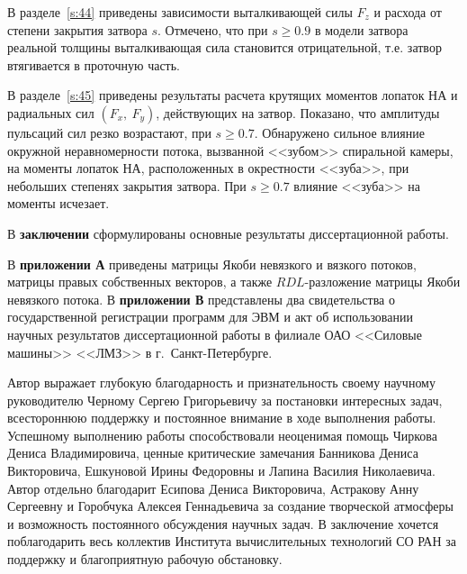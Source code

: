 В разделе~\ref{s:44} приведены зависимости выталкивающей силы $F_z$ и расхода от степени закрытия затвора $s$.
Отмечено, что при $s \geqslant 0.9$ в модели затвора реальной толщины выталкивающая сила становится 
отрицательной, т.е. затвор втягивается в проточную часть.

В разделе~\ref{s:45} приведены результаты расчета крутящих моментов лопаток НА 
и радиальных сил $(F_x,\ F_y)$, действующих на затвор. 
Показано, что амплитуды пульсаций сил резко возрастают, при $s \geqslant 0.7$. 
Обнаружено сильное влияние окружной неравномерности потока, вызванной <<зубом>> спиральной камеры, на моменты 
лопаток НА, расположенных в окрестности <<зуба>>, при небольших степенях закрытия 
затвора. При $s \geqslant 0.7$ влияние <<зуба>> на моменты исчезает.

В \textbf{заключении} сформулированы основные результаты диссертационной работы.

В \textbf{приложении А} приведены матрицы Якоби невязкого и вязкого потоков, матрицы правых  
собственных векторов, а также $RDL$-разложение матрицы Якоби невязкого потока. В \textbf{приложении В} 
представлены два свидетельства о государственной регистрации программ для ЭВМ и акт об использовании научных 
результатов диссертационной работы в филиале ОАО <<Силовые машины>> <<ЛМЗ>> в г.~Санкт-Петербурге.  

Автор выражает глубокую благодарность и признательность своему научному руководителю Черному
Сергею Григорьевичу за постановки интересных задач, 
всестороннюю поддержку и постоянное внимание в ходе выполнения работы. 
Успешному выполнению работы способствовали неоценимая 
помощь Чиркова Дениса Владимировича, ценные критические замечания Банникова Дениса Викторовича, 
Ешкуновой Ирины Федоровны и Лапина Василия Николаевича. 
Автор отдельно благодарит Есипова Дениса Викторовича, Астракову Анну Сергеевну и Горобчука Алексея 
Геннадьевича за создание творческой атмосферы и возможность постоянного обсуждения научных задач. 
В заключение хочется поблагодарить весь коллектив Института вычислительных технологий СО РАН за поддержку
и благоприятную рабочую обстановку.
